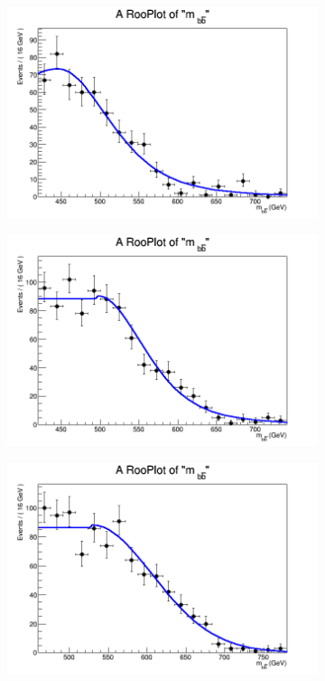 \begin{figure}[phtb!]
\begin{center}
  \begin{subfigure}[$m_{A}=550$ GeV]{0.4\textwidth}\includegraphics[width=\textwidth]{FitResults/images/fitMC_bAbb550_6.png}\end{subfigure}
  \begin{subfigure}[$m_{A}=600$ GeV]{0.4\textwidth}\includegraphics[width=\textwidth]{FitResults/images/fitMC_bAbb600_6.png}\end{subfigure}
  \begin{subfigure}[$m_{A}=650$ GeV]{0.4\textwidth}\includegraphics[width=\textwidth]{FitResults/images/fitMC_bAbb650_6.png}\end{subfigure}

\end{center}
\end{figure}
